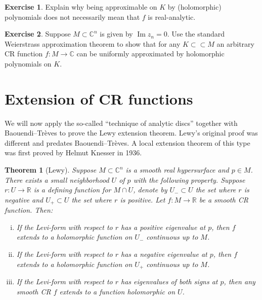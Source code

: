 \documentclass[12pt,openany]{book}
\renewcommand{\Im}{\operatorname{Im}}
\newcommand{\C}{{\mathbb{C}}}
\newcommand{\R}{{\mathbb{R}}}
\theoremstyle{plain}
\newtheorem{thm}{Theorem}[section]
\theoremstyle{remark}
\theoremstyle{definition}
\newenvironment{exbox}{%
    \def\FrameCommand{\vrule width 1pt \relax\hspace {10pt}}%
    \MakeFramed {\advance \hsize -\width \FrameRestore }%
}{%
    \endMakeFramed
}
\theoremstyle{exercise}
\newtheorem{exercise}{Exercise}[section]
\theoremstyle{example}
\begin{document}
\begin{exbox}
\begin{exercise}
Explain why being approximable on $K$ by (holomorphic) polynomials does not
necessarily mean that
$f$ is real-analytic.
\end{exercise}

\begin{exercise}
Suppose $M \subset \C^n$ is given by $\Im z_n = 0$.  Use the standard
Weierstrass approximation theorem to show that for any $K \subset \subset M$
an arbitrary CR function $f \colon M \to \C$ can be uniformly approximated
by holomorphic polynomials on $K$.
\end{exercise}
\end{exbox}


\section{Extension of CR functions}

We will now apply the so-called ``technique of analytic discs'' together
with
Baouendi--Tr{\`e}ves to prove the
Lewy extension theorem.  Lewy's original proof was different
and predates Baouendi--Tr{\`e}ves.  A local extension theorem of this type
was first proved by Helmut Knesser in 1936.

\begin{thm}[Lewy]%
Suppose $M \subset \C^n$ is a smooth real hypersurface and $p \in M$.
There exists a small neighborhood $U$ of $p$ with the following
property.
Suppose $r \colon U \to \R$ is
a defining function for $M \cap U$, denote by $U_- \subset U$ the set where $r$
is negative and $U_+ \subset U$ the set where $r$ is positive.
Let $f \colon M \to \R$ be a smooth CR function.
Then:

\begin{enumerate}[(i)]
\item
If the Levi-form with respect to $r$ has a positive eigenvalue at $p$, then
$f$ extends to a holomorphic function on $U_-$ continuous up to $M$.
\item
If the Levi-form with respect to $r$ has a negative eigenvalue at $p$, then
$f$ extends to a holomorphic function on $U_+$ continuous up to $M$.
\item
If the Levi-form with respect to $r$ has eigenvalues of both signs at $p$, then any smooth
CR $f$ extends to
a function holomorphic on $U$.
\end{enumerate}
\end{thm}
\end{document}
